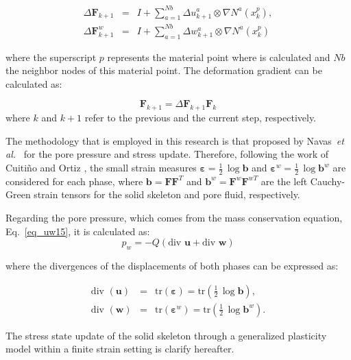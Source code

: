 \documentclass[preprint,12pt,a4paper]{elsarticle}
\begin{document}
\begin{eqnarray}
\Delta \mathbf{F}_{k+1} &=& I+\sum_{a=1}^{Nb}\Delta u_{k+1}^a \otimes \nabla N^a(x_{k}^p), \\
\Delta \mathbf{F}^w_{k+1} &=&I+\sum_{a=1}^{Nb}\Delta w_{k+1}^a \otimes \nabla N^a(x_{k}^p)
\end{eqnarray}

where the superscript $p$ represents the material point where is calculated and $Nb$ the neighbor nodes of this material point. The deformation gradient can be calculated as:

\begin{equation}
\mathbf{F}_{k+1} = \Delta \mathbf{F}_{k+1} \mathbf{F}_{k} 
\end{equation}
where $k$ and $k+1$ refer to the previous and the current step, respectively.

The methodology that is employed in this research is that proposed by Navas~\textit{et al.}~\cite{Navas:17c} for the pore pressure and stress update. Therefore, following the work of Cuiti\~no and Ortiz \cite{cuitino:92}, the small strain measures $\boldsymbol{\varepsilon} = \frac{1}{2}\,\log\mathbf{b}$ and $\boldsymbol{\varepsilon}^w = \frac{1}{2}\,\log\mathbf{b}^w$ are considered for each phase, where $\mathbf{b}=\mathbf{F}\mathbf{F}^T$ and $\mathbf{b}^w=\mathbf{F}^w\mathbf{F}^{wT}$ are the left Cauchy-Green strain tensors for the solid skeleton and pore fluid, respectively.

Regarding the pore pressure, which comes from the mass conservation equation, Eq.~\eqref{eq_uw15}, it is calculated as:
\begin{equation}
p_w = -Q \left( \mbox{div } \boldsymbol{u} + \mbox{div } \boldsymbol{w} \right) 
\end{equation}

where the divergences of the displacements of both phases can be expressed as:

\begin{eqnarray}
\mbox{div }(\boldsymbol{u}) &=& \mbox{tr}(\boldsymbol{\varepsilon})=\mbox{tr} \left (\frac{1}{2}\,\log\mathbf{b} \right), \\
\mbox{div }(\boldsymbol{w}) &=& \mbox{tr} (\boldsymbol{\varepsilon}^w)=\mbox{tr} \left(\frac{1}{2}\,\log\mathbf{b}^w \right).
\end{eqnarray}

The stress state update of the solid skeleton through a generalized plasticity model within a finite strain setting is clarify hereafter. 
\end{document}
